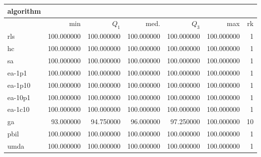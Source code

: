 \begin{tabular}{@{}l*{5}{>{{}}N{3}{0}}>{{}}N{2}{0}@{}}
\toprule
{algorithm} &  \\
\midrule
& {min} & {$Q_1$} & {med.} & {$Q_3$} & {max} & {rk}\\
\midrule
rls & {\color{blue}} 100.000000 & {\color{blue}} 100.000000 & {\color{blue}} 100.000000 & {\color{blue}} 100.000000 & {\color{blue}} 100.000000 & 1\\
hc & {\color{blue}} 100.000000 & {\color{blue}} 100.000000 & {\color{blue}} 100.000000 & {\color{blue}} 100.000000 & {\color{blue}} 100.000000 & 1\\
sa & {\color{blue}} 100.000000 & {\color{blue}} 100.000000 & {\color{blue}} 100.000000 & {\color{blue}} 100.000000 & {\color{blue}} 100.000000 & 1\\
ea-1p1 & {\color{blue}} 100.000000 & {\color{blue}} 100.000000 & {\color{blue}} 100.000000 & {\color{blue}} 100.000000 & {\color{blue}} 100.000000 & 1\\
ea-1p10 & {\color{blue}} 100.000000 & {\color{blue}} 100.000000 & {\color{blue}} 100.000000 & {\color{blue}} 100.000000 & {\color{blue}} 100.000000 & 1\\
ea-10p1 & {\color{blue}} 100.000000 & {\color{blue}} 100.000000 & {\color{blue}} 100.000000 & {\color{blue}} 100.000000 & {\color{blue}} 100.000000 & 1\\
ea-1c10 & {\color{blue}} 100.000000 & {\color{blue}} 100.000000 & {\color{blue}} 100.000000 & {\color{blue}} 100.000000 & {\color{blue}} 100.000000 & 1\\
ga & 93.000000 & 94.750000 & 96.000000 & 97.250000 & {\color{blue}} 100.000000 & 10\\
pbil & {\color{blue}} 100.000000 & {\color{blue}} 100.000000 & {\color{blue}} 100.000000 & {\color{blue}} 100.000000 & {\color{blue}} 100.000000 & 1\\
umda & {\color{blue}} 100.000000 & {\color{blue}} 100.000000 & {\color{blue}} 100.000000 & {\color{blue}} 100.000000 & {\color{blue}} 100.000000 & 1\\
\bottomrule
\end{tabular}
